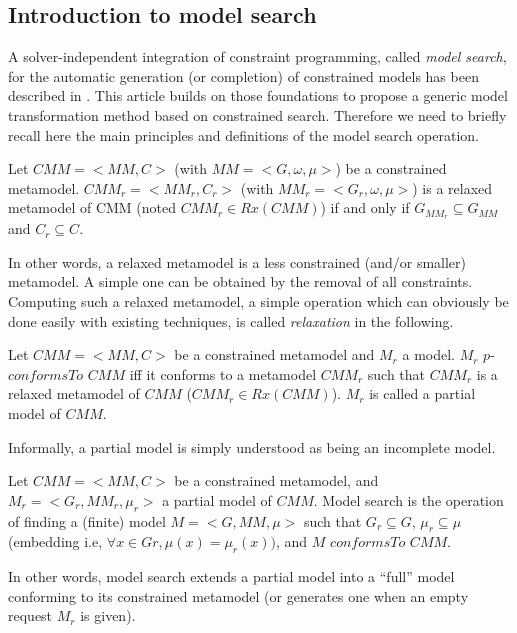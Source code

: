 \documentclass{llncs}
\begin{document}
\subsection{Introduction to model search}
\label{sec:ms}
A solver-independent integration of constraint programming, called \emph{model
search}, for the automatic generation (or completion) of constrained models has been described in
\cite{modelsearch09}. This article builds on those foundations to propose a generic
model transformation method based on constrained search. Therefore we need to briefly recall here
the main principles and definitions of the model search operation.\\
\begin{definition}\label{def:relaxed-metamodel} Let
$CMM=<MM,C>$ (with $MM=<G, \omega,
\mu>$) be a constrained metamodel. $CMM_r=<MM_r,C_r>$ (with $MM_r=<G_r, \omega,
\mu>$) is a relaxed metamodel of CMM (noted $CMM_r \in
Rx(CMM)$) if and only if $G_{MM_r} \subseteq G_{MM}$ and $C_r \subseteq C$.
\end{definition}
In other words, a relaxed metamodel is a less constrained (and/or smaller) metamodel. A simple one can be obtained by the removal of all constraints. Computing such a relaxed
metamodel, a simple operation which can obviously be done easily with existing techniques, is called \emph{relaxation} in the following.
\begin{definition} \label{def:partial-model} Let
$CMM=<MM,C>$ be a constrained metamodel and $M_r$ a model. $M_r$ $p$-$conformsTo$ $CMM$ iff it conforms to a
metamodel $CMM_r$ such that $CMM_r$ is a relaxed metamodel of $CMM$ ($CMM_r \in
Rx(CMM)$). $M_r$ is called a partial model of $CMM$.
\end{definition}
Informally, a partial model is simply understood as being an incomplete model.
\begin{definition}\label{def:model-search} Let $CMM=<MM,C>$ be a
constrained metamodel, and $M_r=<G_r, MM_r, \mu_r>$ a partial model of $CMM$. Model search is the operation
of finding a (finite) model $M=<G, MM, \mu>$ such that $G_r \subseteq G$, $\mu_r
\subseteq \mu$ (embedding i.e, $\forall x \in Gr, \mu(x) = \mu_r(x))$, and $M$
$conformsTo$ $CMM$.
\end{definition}
In other words, model search extends a partial model into a ``full'' model conforming to its constrained metamodel (or generates one when an empty request $M_r$ is given).
\end{document}
